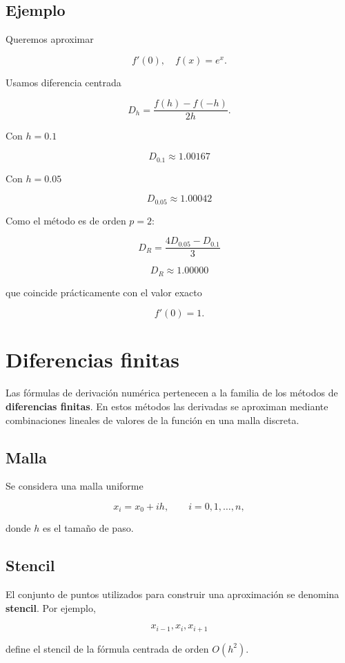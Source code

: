 \documentclass[12pt,a4paper]{article}
\theoremstyle{definition}
\theoremstyle{remark}
\begin{document}
\subsection{Ejemplo}

Queremos aproximar

\[
f'(0), \quad f(x)=e^x.
\]

Usamos diferencia centrada

\[
D_h = \frac{f(h)-f(-h)}{2h}.
\]

Con $h=0.1$

\[
D_{0.1} \approx 1.00167
\]

Con $h=0.05$

\[
D_{0.05} \approx 1.00042
\]

Como el método es de orden $p=2$:

\[
D_R = \frac{4D_{0.05}-D_{0.1}}{3}
\]

\[
D_R \approx 1.00000
\]

que coincide prácticamente con el valor exacto

\[
f'(0)=1.
\]

\newpage

\section{Diferencias finitas}

Las fórmulas de derivación numérica pertenecen a la familia de los métodos
de \textbf{diferencias finitas}. En estos métodos las derivadas se aproximan
mediante combinaciones lineales de valores de la función en una malla discreta.

\subsection{Malla}

Se considera una malla uniforme

\[
x_i = x_0 + ih, \qquad i=0,1,\dots,n,
\]

donde $h$ es el tamaño de paso.

\subsection{Stencil}

El conjunto de puntos utilizados para construir una aproximación se denomina
\textbf{stencil}. Por ejemplo,

\[
x_{i-1},x_i,x_{i+1}
\]

define el stencil de la fórmula centrada de orden $O(h^2)$.
\end{document}
